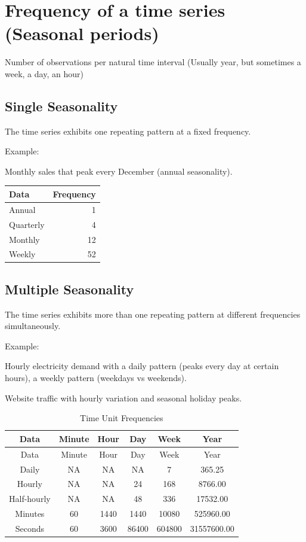 \documentclass[
  11pt,
  a4paper,
]{report}
\begin{document}
\section{Frequency of a time series (Seasonal
periods)}\label{frequency-of-a-time-series-seasonal-periods}

Number of observations per natural time interval (Usually year, but
sometimes a week, a day, an hour)

\subsection{Single Seasonality}\label{single-seasonality}

The time series exhibits one repeating pattern at a fixed frequency.

Example:

Monthly sales that peak every December (annual seasonality).

\begin{longtable}[]{@{}lr@{}}
\toprule\noalign{}
Data & Frequency \\
\midrule\noalign{}
\endhead
\bottomrule\noalign{}
\endlastfoot
Annual & 1 \\
Quarterly & 4 \\
Monthly & 12 \\
Weekly & 52 \\
\end{longtable}

\subsection{Multiple Seasonality}\label{multiple-seasonality}

The time series exhibits more than one repeating pattern at different
frequencies simultaneously.

Example:

Hourly electricity demand with a daily pattern (peaks every day at
certain hours), a weekly pattern (weekdays vs weekends).

Website traffic with hourly variation and seasonal holiday peaks.

\begin{longtable}[]{@{}cccccc@{}}
\caption{Time Unit Frequencies}\tabularnewline
\toprule\noalign{}
Data & Minute & Hour & Day & Week & Year \\
\midrule\noalign{}
\endfirsthead
\toprule\noalign{}
Data & Minute & Hour & Day & Week & Year \\
\midrule\noalign{}
\endhead
\bottomrule\noalign{}
\endlastfoot
Daily & NA & NA & NA & 7 & 365.25 \\
Hourly & NA & NA & 24 & 168 & 8766.00 \\
Half-hourly & NA & NA & 48 & 336 & 17532.00 \\
Minutes & 60 & 1440 & 1440 & 10080 & 525960.00 \\
Seconds & 60 & 3600 & 86400 & 604800 & 31557600.00 \\
\end{longtable}
\end{document}
